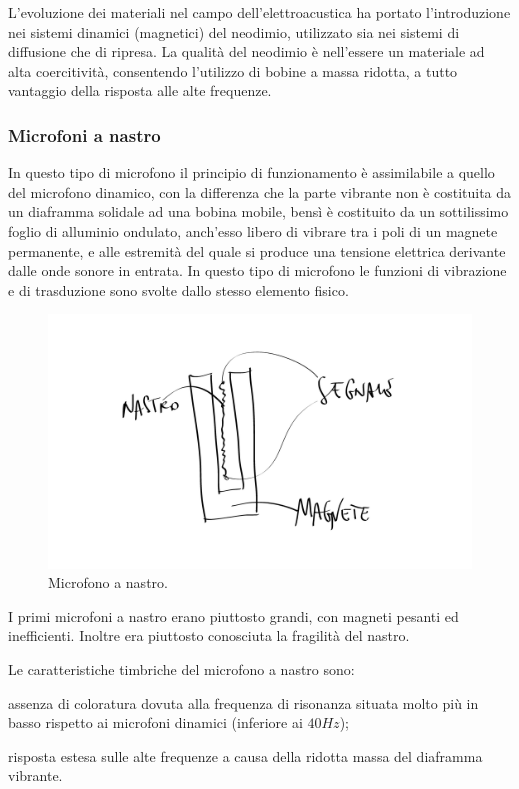 \begin{refsection}
L'evoluzione dei materiali nel campo dell'elettroacustica ha portato l'introduzione
nei sistemi dinamici (magnetici) del neodimio, utilizzato sia nei sistemi di
diffusione che di ripresa. La qualità del neodimio è nell'essere un materiale ad
alta coercitività, consentendo l’utilizzo di bobine a massa ridotta, a tutto
vantaggio della risposta alle alte frequenze.

\subsubsection{Microfoni a nastro}

In questo tipo di microfono il principio di funzionamento è assimilabile a
quello del microfono dinamico, con la differenza che la parte vibrante non è
costituita da un diaframma solidale ad una bobina mobile, bensì è costituito
da un sottilissimo foglio di alluminio
ondulato, anch’esso libero di vibrare tra i poli di un magnete permanente, e
alle estremità del quale si produce una tensione elettrica derivante dalle
onde sonore in entrata. In questo tipo di microfono le funzioni
di vibrazione e di trasduzione sono svolte dallo stesso elemento fisico.

\begin{figure}[h]
\centering
\includegraphics[width=0.99\columnwidth]{CAPITOLI/0200/img/mic-nastro.png}
\caption[]{Microfono a nastro.}
\label{mic:nastro}
\end{figure}

I primi microfoni a nastro erano piuttosto grandi, con magneti pesanti ed
inefficienti. Inoltre era piuttosto conosciuta la fragilità del nastro.

Le caratteristiche timbriche del microfono a nastro sono:

\begin{compactitem}
  \item assenza di coloratura dovuta alla frequenza di risonanza situata molto
  più in basso rispetto ai microfoni dinamici (inferiore ai $40Hz$);
  \item risposta estesa sulle alte frequenze a causa della ridotta massa del
  diaframma vibrante.
\end{compactitem}


\end{refsection}
